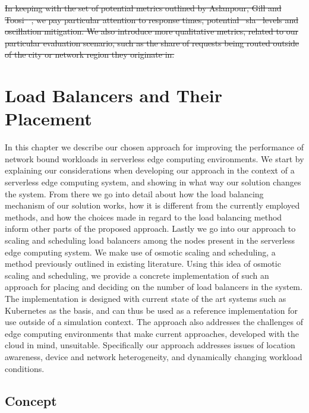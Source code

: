 \documentclass[draft,final]{vutinfth} %
\providecommand{\DIFdeltex}[1]{{\protect\color{red}\sout{#1}}}                      %
\providecommand{\DIFdelend}{} %
\providecommand{\DIFdel}[1]{\texorpdfstring{\DIFdeltex{#1}}{}} %
\begin{document}
\DIFdel{In keeping with the set of potential metrics outlined by Aslanpour, Gill and Toosi\mbox{%
\cite{aslanpourPerformanceEvaluationMetrics2020a}}\hskip0pt%
, we pay particular attention to response times, potential \mbox{%
\gls{sla} }\hskip0pt%
levels and oscillation mitigation.
We also introduce more qualitative metrics, related to our particular evaluation scenario, such as the share of requests being routed outside of the city or network region they originate in.
}\DIFdelend %
\chapter{Load Balancers and Their Placement}
In this chapter we describe our chosen approach for improving the performance of network bound workloads in serverless edge computing environments. We start by explaining our considerations when developing our approach in the context of a serverless edge computing system, and showing in what way our solution changes the system. From there we go into detail about how the load balancing mechanism of our solution works, how it is different from the currently employed methods, and how the choices made in regard to the load balancing method inform other parts of the proposed approach.
Lastly we go into our approach to scaling and scheduling load balancers among the nodes present in the serverless edge computing system. We make use of osmotic scaling and scheduling, a method previously outlined in existing literature. Using this idea of osmotic scaling and scheduling, we provide a concrete implementation of such an approach for placing and deciding on the number of load balancers in the system. The implementation is designed with current state of the art systems such as Kubernetes as the basis, and can thus be used as a reference implementation for use outside of a simulation context. The approach also addresses the challenges of edge computing environments that make current approaches, developed with the cloud in mind, unsuitable. Specifically our approach addresses issues of location awareness, device and network heterogeneity, and dynamically changing workload conditions.
\section{Concept}
\end{document}
